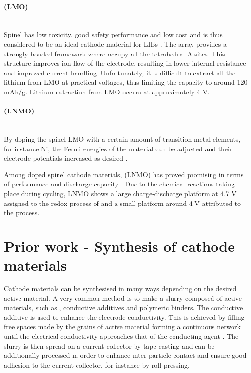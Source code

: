 \documentclass[Main/main.tex]{subfiles}
\begin{document}
\paragraph{ (LMO)}~\\[0.8em]
Spinel  has low toxicity, good safety performance and low cost and is thus considered to be an ideal cathode material for LIBs \cite{LNMO}. The  array provides a strongly bonded framework where  occupy all the tetrahedral A sites. This structure improves ion flow of the electrode, resulting in lower internal resistance and improved current handling. Unfortunately, it is difficult to extract all the lithium from LMO at practical voltages, thus limiting the capacity to around 120 \si{mAh/g}. Lithium extraction from LMO occurs at approximately 4 V.

\paragraph{ (LNMO)}~\\[0.8em]
By doping the spinel LMO with a certain amount of transition metal elements, for instance Ni, the Fermi energies of the material can be adjusted and their electrode potentials increased as desired \cite{LNMO}.

Among doped spinel cathode materials,  (LNMO) has proved promising in terms of performance and discharge capacity \cite{LNMO}. Due to the chemical reactions taking place during cycling, LNMO shows a large charge-discharge platform at 4.7 \si{V} assigned to the redox process of  and a small platform around 4 \si{V} attributed to the  process. 


\section[Prior work]{Prior work - Synthesis of cathode materials}
Cathode materials can be synthesised in many ways depending on the desired active material. A very common method is to make a slurry composed of active materials, such as , conductive additives and polymeric binders. The conductive additive is used to enhance the electrode conductivity. This is achieved by filling free spaces made by the grains of active material forming a continuous network until the electrical conductivity approaches that of the conducting agent \cite{1_additive}. The slurry is then spread on a current collector by tape casting and can be additionally processed in order to enhance inter-particle contact and ensure good adhesion to the current collector, for instance by roll pressing. 
\end{document}
